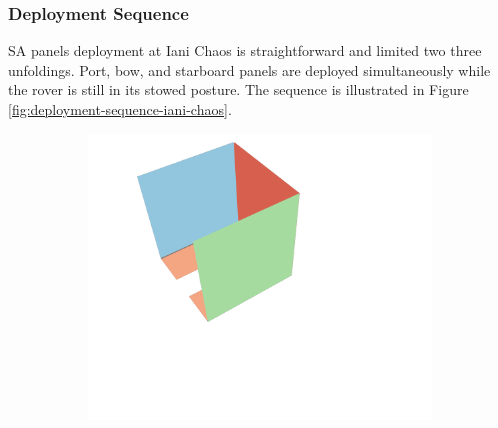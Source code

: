 \subsubsection{Deployment Sequence}

\ac{SA} panels deployment at Iani Chaos is straightforward and limited two three unfoldings. Port, bow, and starboard panels are deployed simultaneously while the rover is still in its stowed posture. The sequence is illustrated in Figure \ref{fig:deployment-sequence-iani-chaos}.

\vspace{0.5cm}

\begin{figure}[h]
\captionsetup[subfigure]{justification=centering}
\vspace{-2ex}
	\centering
    \setlength{\subfigureWidth}{0.32\textwidth}
    \setlength{\graphicsHeight}{30mm}
    \hypersetup{hidelinks=true}%
	\begin{subfigure}[t]{\subfigureWidth}
        \centering
		\includegraphics[height=\graphicsHeight]{sections/design/solar-array/images/deployment/iani-chaos/solar_array_deployment_iani_chaos_000.png}
		\label{fig:sub:deployment-sequence-iani-chaos-stowed}
	\end{subfigure}\hfill
	\begin{subfigure}[t]{\subfigureWidth}
        \centering

\end{subfigure}
\end{figure}
